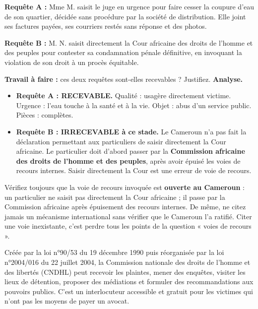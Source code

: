 \documentclass[11pt]{article}
\begin{document}
\begin{exoresolu}
\textbf{Requête A :} Mme M. saisit le juge en urgence pour faire cesser la coupure d'eau de son quartier, décidée sans procédure par la société de distribution. Elle joint ses factures payées, ses courriers restés sans réponse et des photos.

\textbf{Requête B :} M. N. saisit directement la Cour africaine des droits de l'homme et des peuples pour contester sa condamnation pénale définitive, en invoquant la violation de son droit à un procès équitable.

\textbf{Travail à faire :} ces deux requêtes sont-elles recevables ? Justifiez.
\tcblower
\textbf{Analyse.}
\begin{itemize}
    \item \textbf{Requête A : RECEVABLE.} Qualité : usagère directement victime. Urgence : l'eau touche à la santé et à la vie. Objet : abus d'un service public. Pièces : complètes.
    \item \textbf{Requête B : IRRECEVABLE à ce stade.} Le Cameroun n'a pas fait la déclaration permettant aux particuliers de saisir directement la Cour africaine. Le particulier doit d'abord passer par la \textbf{Commission africaine des droits de l'homme et des peuples}, après avoir épuisé les voies de recours internes. Saisir directement la Cour est une erreur de voie de recours.
\end{itemize}
\end{exoresolu}

\begin{attention}
Vérifiez toujours que la voie de recours invoquée est \textbf{ouverte au Cameroun} : un particulier ne saisit pas directement la Cour africaine ; il passe par la Commission africaine après épuisement des recours internes. De même, ne citez jamais un mécanisme international sans vérifier que le Cameroun l'a ratifié. Citer une voie inexistante, c'est perdre tous les points de la question « voies de recours ».
\end{attention}

\begin{savaistu}
Créée par la loi n°90/53 du 19 décembre 1990 puis réorganisée par la loi n°2004/016 du 22 juillet 2004, la Commission nationale des droits de l'homme et des libertés (CNDHL) peut recevoir les plaintes, mener des enquêtes, visiter les lieux de détention, proposer des médiations et formuler des recommandations aux pouvoirs publics. C'est un interlocuteur accessible et gratuit pour les victimes qui n'ont pas les moyens de payer un avocat.
\end{savaistu}
\end{document}
